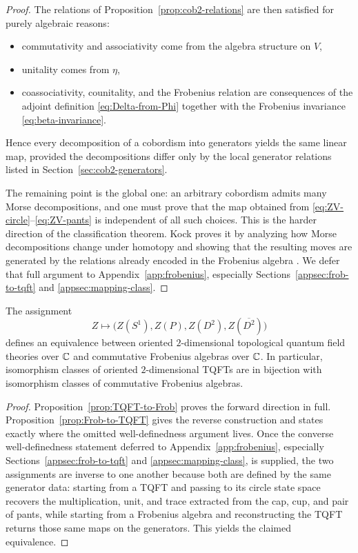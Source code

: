 \begin{proof}
\noindent The relations of Proposition~\ref{prop:cob2-relations} are then satisfied for purely algebraic reasons:
\begin{itemize}
\item commutativity and associativity come from the algebra structure on $V$,
\item unitality comes from $\eta$,
\item coassociativity, counitality, and the Frobenius relation are consequences of the adjoint definition \eqref{eq:Delta-from-Phi} together with the Frobenius invariance \eqref{eq:beta-invariance}.
\end{itemize}
Hence every decomposition of a cobordism into generators yields the same linear map, provided the decompositions differ only by the local generator relations listed in Section~\ref{sec:cob2-generators}.

\medskip

\noindent The remaining point is the global one: an arbitrary cobordism admits many Morse decompositions, and one must prove that the map obtained from \eqref{eq:ZV-circle}--\eqref{eq:ZV-pants} is independent of all such choices. This is the harder direction of the classification theorem. Kock proves it by analyzing how Morse decompositions change under homotopy and showing that the resulting moves are generated by the relations already encoded in the Frobenius algebra \cite[Chs.~1--2]{Kock2004Frobenius}. We defer that full argument to Appendix~\ref{app:frobenius}, especially Sections~\ref{appsec:frob-to-tqft} and \ref{appsec:mapping-class}.
\end{proof}

\begin{theorem}\label{thm:2D-TQFT-Frob}
The assignment
\begin{equation}\label{eq:classification-forward}
Z \longmapsto \bigl(Z(S^1), Z(P), Z(D^2), Z(\overline{D^2})\bigr)
\end{equation}
defines an equivalence between oriented $2$-dimensional topological quantum field theories over $\mathbb{C}$ and commutative Frobenius algebras over $\mathbb{C}$. In particular, isomorphism classes of oriented $2$-dimensional TQFTs are in bijection with isomorphism classes of commutative Frobenius algebras.
\end{theorem}

\begin{proof}
Proposition~\ref{prop:TQFT-to-Frob} proves the forward direction in full. Proposition~\ref{prop:Frob-to-TQFT} gives the reverse construction and states exactly where the omitted well-definedness argument lives. Once the converse well-definedness statement deferred to Appendix~\ref{app:frobenius}, especially Sections~\ref{appsec:frob-to-tqft} and \ref{appsec:mapping-class}, is supplied, the two assignments are inverse to one another because both are defined by the same generator data: starting from a TQFT and passing to its circle state space recovers the multiplication, unit, and trace extracted from the cap, cup, and pair of pants, while starting from a Frobenius algebra and reconstructing the TQFT returns those same maps on the generators. This yields the claimed equivalence.
\end{proof}


